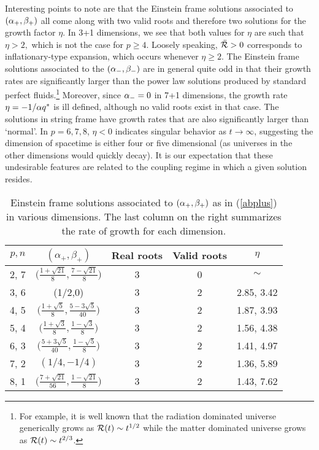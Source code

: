 \documentclass[amsmath,amssymb,11pt]{article}
\begin{document}
Interesting points to note are that the Einstein frame solutions associated to $(\alpha_+,\beta_+)$ all come along with two valid roots and therefore two solutions for the growth factor $\eta$. In 3+1 dimensions, we see that both values for $\eta$ are such that $\eta >2,$ which is not the case for $p\geq 4.$ Loosely speaking, $\ddot{\mathcal{R}}>0$ corresponds to inflationary-type expansion, which occurs whenever $\eta\geq 2.$  The Einstein frame solutions associated to the $(\alpha_-,\beta_-)$ are in general quite odd in that their growth rates are significantly larger than the power law solutions produced by standard perfect fluids.\footnote{For example, it is well known that the radiation dominated universe generically grows as $\mathcal{R}(t)\sim t^{1/2}$ while the matter dominated universe grows as $\mathcal{R}(t)\sim t^{2/3}$.}  Moreover, since $\alpha_-=0$ in 7+1 dimensions, the growth rate $\eta=-1/\alpha q^*$ is ill defined, although no valid roots exist in that case. The solutions in string frame have growth rates that are also significantly larger than `normal'. In $p=6,7,8$, $\eta<0$ indicates singular behavior as $t\rightarrow\infty$, suggesting the dimension of spacetime is either four or five dimensional (as universes in the other dimensions would quickly decay).  It is our expectation that these undesirable features are related to the coupling regime in which a given solution resides. 








\begin{table}[t]
\begin{center}
\begin{tabular}{c| c | c | c | c }
$p,n$ & $(\alpha_+,\beta_+)$  & Real roots & Valid roots & $\eta$ \\ \hline 
2, 7 & $\Big(\frac{1+\sqrt{21}}{8},\frac{7-\sqrt{21}}{8}\Big)$ & 3 & 0 & $\sim$ \\
3, 6 & (1/2,0) & 3 & 2 & 2.85, 3.42 \\
4, 5 & $\Big(\frac{1+\sqrt{5}}{8},\frac{5-3\sqrt{5}}{40}\Big)$ &  3& 2 & 1.87, 3.93 \\
5, 4 & $\Big(\frac{1+\sqrt{3}}{8}, \frac{1-\sqrt{3}}{8}\Big)$ & 3& 2 & 1.56, 4.38 \\
6, 3 & $\Big(\frac{5+3\sqrt{5}}{40}, \frac{1-\sqrt{5}}{8}\Big)$ &  3 & 2 & 1.41, 4.97  \\
7, 2 & $(1/4,-1/4)$  &3 & 2 & 1.36, 5.89 \\
8, 1 & $\Big(\frac{7 + \sqrt{21}}{56}, \frac{1-\sqrt{21}}{8}\Big)$  & 3 & 2 & 1.43, 7.62
\end{tabular}
\end{center}
\caption{Einstein frame solutions associated to $(\alpha_+,\beta_+)$ as in (\ref{abplus}) in various dimensions. The last column on the right summarizes the rate of growth for each dimension. }\label{plussolstable}
\end{table}
\end{document}
